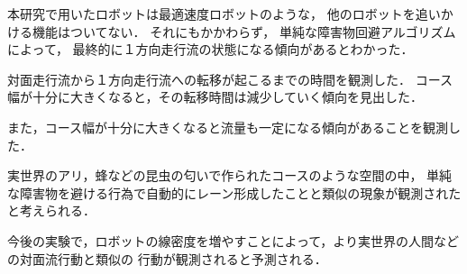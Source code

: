 本研究で用いたロボットは最適速度ロボット\cite{yamada19}のような，
他のロボットを追いかける機能はついてない．
それにもかかわらず，
単純な障害物回避アルゴリズムによって，
最終的に１方向走行流の状態になる傾向があるとわかった．

対面走行流から１方向走行流への転移が起こるまでの時間を観測した．
コース幅が十分に大きくなると，その転移時間は減少していく傾向を見出した．

また，コース幅が十分に大きくなると流量も一定になる傾向があることを観測した．

実世界のアリ，蜂などの昆虫の匂いで作られたコースのような空間の中，
単純な障害物を避ける行為で自動的にレーン形成したことと類似の現象が観測されたと考えられる．

今後の実験で，ロボットの線密度を増やすことによって，より実世界の人間などの対面流行動と類似の
行動が観測されると予測される．

